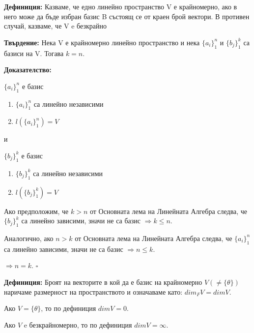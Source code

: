 \documentclass[fleqn,12pt]{article}
\begin{document}
\begin{flushleft}
    \vspace{5mm}
    
    \textbf{Дефиниция:} Казваме, че едно линейно пространство V е крайномерно, ако в него може да бъде избран базис B състоящ се от краен брой вектори. В противен случай, казваме, че V e безкрайно

    \vspace{5mm}
    
    \textbf{Твърдение:} Нека V е крайномерно линейно пространство и нека $\{ a_i \}_1^n $ и $\{ b_j \}_1^k $ са базиси на V. Тогава $ k = n $.

    \vspace{5mm}
    
        \textbf{Доказателство:}

        $ \{a_i\}_1^n $ е базис
        \begin{enumerate}
            \item $\{a_i\}_1^n $ са линейно независими
            \item $ l(\{a_i\}_1^n) = V $
        \end{enumerate}

        и

        $ \{b_j\}_1^k $ е базис
        \begin{enumerate}
            \item $\{b_j\}_1^k $ са линейно независими
            \item $ l(\{b_j\}_1^k) = V $
        \end{enumerate}

        Ако предположим, че $k > n $ от Основната лема на Линейната Алгебра следва, че $ \{b_j\}_1^k $ са линейно зависими, значи не са базис $\Rightarrow k \leq n $.

        Аналогично, ако $n > k $ от Основната лема на Линейната Алгебра следва, че $ \{a_i\}_1^n $ са линейно зависими, значи не са базис $\Rightarrow n \leq k $.

        $\Rightarrow n = k$. $\square$


    
    \vspace{5mm}
    
    \textbf{Дефиниция:} Броят на векторите в кой да е базис на крайномерно $V ( \neq \{\theta\}) $ наричаме размерност на пространството и означаваме като: $dim_F V = dimV$.

    Ако $V = \{\theta\} $, то по дефиниция $ dimV = 0$.

    Ако $V$ e безкрайномерно, то по дефиниция $ dimV = \infty$.


\end{flushleft}
\end{document}
